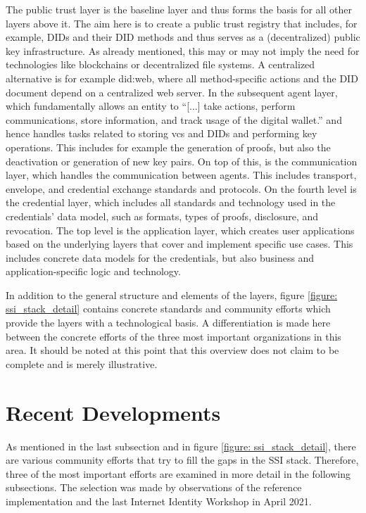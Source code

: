         The public trust layer is the baseline layer and thus forms the basis for all other layers above it. The aim here is to create a public trust registry that includes, for example, \acp{DID} and their \ac{DID} methods and thus serves as a (decentralized) public key infrastructure. As already mentioned, this may or may not imply the need for technologies like blockchains or decentralized file systems. A centralized alternative is for example did:web, where all method-specific actions and the \ac{DID} document depend on a centralized web server.  In the subsequent agent layer, which fundamentally allows an entity to “[...] take actions, perform communications, store information, and track usage of the digital wallet.” \cite[p. 192]{preukschat_self-sovereign_2021} and hence handles tasks related to storing \acp{vc} and \acp{DID} and performing key operations. This includes for example the generation of proofs, but also the deactivation or generation of new key pairs. On top of this, is the communication layer, which handles the communication between agents. This includes transport, envelope, and credential exchange standards and protocols. On the fourth level is the credential layer, which includes all standards and technology used in the credentials' data model, such as formats, types of proofs, disclosure, and revocation. The top level is the application layer, which creates user applications based on the underlying layers that cover and implement specific use cases. This includes concrete data models for the credentials, but also business and application-specific logic and technology. \cite{heck_ssi_2020, yildiz_layers_2021, davie_0289_2021, preukschat_self-sovereign_2021}
        
        In addition to the general structure and elements of the layers, figure \ref{figure: ssi_stack_detail} contains concrete standards and community efforts which provide the layers with a technological basis. A differentiation is made here between the concrete efforts of the three most important organizations in this area. It should be noted at this point that this overview does not claim to be complete and is merely illustrative.
		
	\section{Recent Developments}
	    As mentioned in the last subsection and in figure \ref{figure: ssi_stack_detail}, there are various community efforts that try to fill the gaps in the \ac{SSI} stack. Therefore, three of the most important efforts are examined in more detail in the following subsections. The selection was made by observations of the reference implementation and the last Internet Identity Workshop in April 2021.
	    
